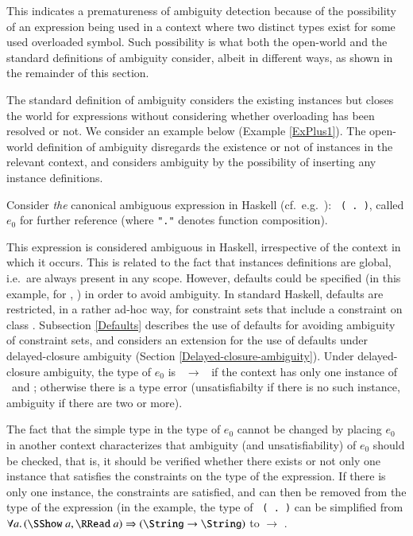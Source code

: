 \documentclass[review]{elsarticle}
\begin{document}
This indicates a prematureness of ambiguity detection because of the
possibility of an expression being used in a context where two distinct
types exist for some used overloaded symbol. Such possibility is what
both the open-world and the standard definitions of ambiguity
consider, albeit in different ways, as shown in the remainder of this
section.

The standard definition of ambiguity considers the existing instances
but closes the world for expressions without considering whether
overloading has been resolved or not. We consider an example below
(Example \ref{ExPlus1}). The open-world definition of ambiguity
disregards the existence or not of instances in the relevant context,
and considers ambiguity by the possibility of inserting any instance
definitions.

\begin{Example}
Consider {\em the\/} canonical ambiguous expression in Haskell
(cf.~e.g.~\cite{MarkJones94a,OutsideIn2011}): {\tt
  (\sshow\ $\!\!$.$\!\!$ \rread)}, called $e_0$ for further reference
(where {\tt "."}  denotes function composition).

This expression is considered ambiguous in Haskell, irrespective of
the context in which it occurs. This is related to the fact that
instances definitions are global, i.e.~are always present in any
scope. However, defaults could be specified (in this example, for
\SShow, \RRead) in order to avoid ambiguity. In standard Haskell,
defaults are restricted, in a rather ad-hoc way, for constraint sets
that include a constraint on class \Num. Subsection \ref{Defaults}
describes the use of defaults for avoiding ambiguity of constraint
sets, and considers an extension for the use of defaults under
delayed-closure ambiguity (Section
\ref{Delayed-closure-ambiguity}).
Under delayed-closure ambiguity, the type of $e_0$ is \String\
$\rightarrow$ \String\ if the context has only one instance of
\SShow\ and \RRead; otherwise there is a type error (unsatisfiabilty
if there is no such instance, ambiguity if there are two or more).

The fact that the simple type in the type of $e_0$ cannot be changed
by placing $e_0$ in another context characterizes that ambiguity (and
unsatisfiability) of $e_0$ should be checked, that is, it should be
verified whether there exists or not only one instance that satisfies
the constraints on the type of the expression.  If there is only one
instance, the constraints are satisfied, and can then be removed from
the type of the expression (in the example, the type of {\tt
  (\sshow\ $\!\!$.$\!\!$ \rread)} can be simplified from $\forall
a.\,(\SShow\ a, \RRead\ a)\Rightarrow (\String \rightarrow \String)$
to \String $\rightarrow$ \String.

\label{ex0}
\end{Example}
\end{document}
